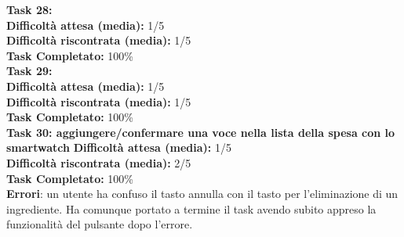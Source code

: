 \begin{itemize}
\textbf{Task 28: }\\
\textbf{Difficoltà attesa (media):} 1/5\\
\textbf{Difficoltà riscontrata (media):} 1/5\\
\textbf{Task Completato:} 100\%\\

\textbf{Task 29:}\\
\textbf{Difficoltà attesa (media):} 1/5\\
\textbf{Difficoltà riscontrata (media):} 1/5\\
\textbf{Task Completato:} 100\%\\

\textbf{Task 30: aggiungere/confermare una voce nella lista della spesa con
lo smartwatch}
\textbf{Difficoltà attesa (media):} 1/5\\
\textbf{Difficoltà riscontrata (media):} 2/5\\
\textbf{Task Completato:} 100\%\\
\textbf{Errori}: un utente ha confuso il tasto annulla con il tasto per
l'eliminazione di un ingrediente. Ha comunque portato a termine il task
avendo subito appreso la funzionalità del pulsante dopo l'errore.





\end{itemize}
